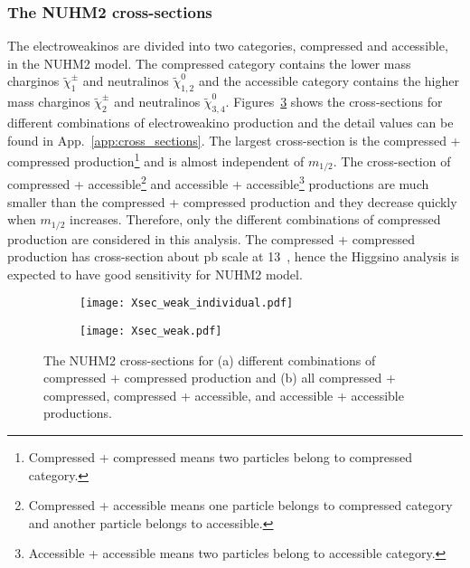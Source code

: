 \subsubsection{The NUHM2 cross-sections}
\label{subsubsed:data_NUHM2_cross_sections}
The electroweakinos are divided into two categories, compressed and accessible, in the NUHM2 model.
The compressed category contains the lower mass charginos $\widetilde{\chi}^{\pm}_{1}$ and neutralinos $\widetilde{\chi}^{0}_{1,2}$ and the accessible category contains the higher mass charginos $\widetilde{\chi}^{\pm}_{2}$ and neutralinos $\widetilde{\chi}^{0}_{3,4}$.
Figures~\ref{fig:data_NUHM2_cross_sections_individual_and_total} shows the cross-sections for different combinations of electroweakino production and the detail values can be found in App.~\ref{app:cross_sections}.
The largest cross-section is the compressed + compressed production\footnote{Compressed + compressed means two particles belong to compressed category.} and is almost independent of $m_{1/2}$.
The cross-section of compressed + accessible\footnote{Compressed + accessible means one particle belongs to compressed category and another particle belongs to accessible.} and accessible + accessible\footnote{Accessible + accessible means two particles belong to accessible category.} productions are much smaller than the compressed + compressed production and they decrease quickly when $m_{1/2}$ increases.
Therefore, only the different combinations of compressed production are considered in this analysis.
The compressed + compressed production has cross-section about pb scale at 13~{\TeV}, hence the Higgsino analysis is expected to have good sensitivity for NUHM2 model.

\begin{figure}[htbp]
    \begin{center}
        \begin{subfigure}[b]{0.48\textwidth}
            \begin{center}
                \texttt{[image: Xsec\_weak\_individual.pdf]}
                \caption{}
                \label{fig:data_NUHM2_cross_sections_individual}
            \end{center}
        \end{subfigure}%
        \begin{subfigure}[b]{0.48\textwidth}
            \begin{center}
                \texttt{[image: Xsec\_weak.pdf]}
                \caption{}
                \label{fig:data_NUHM2_cross_sections}
            \end{center}
        \end{subfigure}
    \end{center}
    \caption{The NUHM2 cross-sections for (a) different combinations of compressed + compressed production and (b) all compressed + compressed, compressed + accessible, and accessible + accessible productions.}
    \label{fig:data_NUHM2_cross_sections_individual_and_total}
\end{figure}

